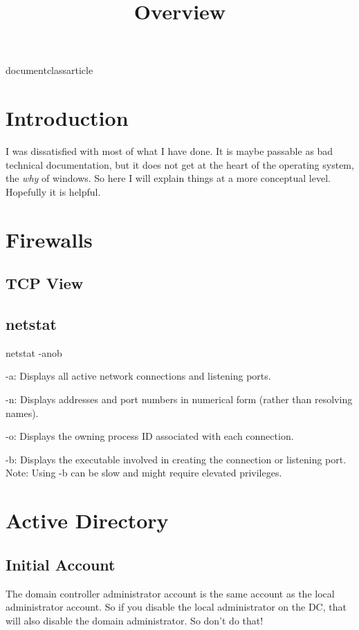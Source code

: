 documentclass{article}
\usepackage{graphicx}
\usepackage{hyperref}
\usepackage{listings}
\usepackage{xcolor}
\usepackage{tikzsymbols}
\usepackage{float}


\title{Overview}

\maketitle

\graphicspath{ {./Images/} }
\tableofcontents

\section{Introduction}
I was dissatisfied with most of what I have done. It is maybe passable as bad technical documentation, but it does not get at the heart of the operating system,
the \textit{why} of windows. So here I will explain things at a more conceptual level. Hopefully it is helpful.

\section{Firewalls}
\subsection{TCP View}

\subsection{netstat}
netstat -anob

-a: Displays all active network connections and listening ports.

-n: Displays addresses and port numbers in numerical form (rather than resolving names).

-o: Displays the owning process ID associated with each connection.

-b: Displays the executable involved in creating the connection or listening port. Note: Using -b can be slow and might require elevated privileges.

\section{Active Directory}
\subsection{Initial Account}
The domain controller administrator account is the same account as the local administrator account. So if you disable the local administrator on the DC,
that will also disable the domain administrator. So don't do that!

